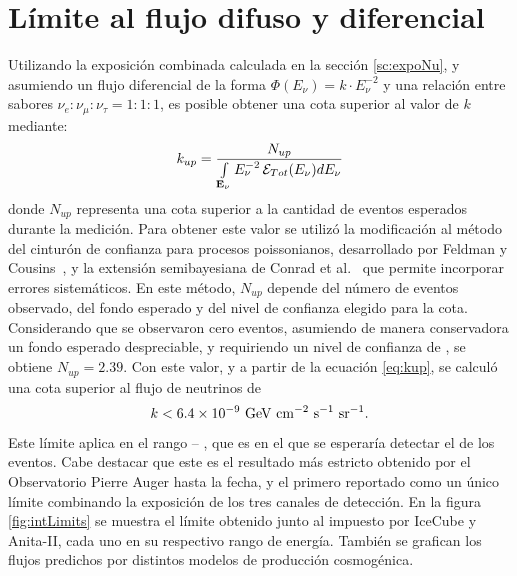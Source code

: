 	\section{L\'imite al flujo difuso y diferencial}
	\label{sc:limiteAuger}
	Utilizando la exposici\'on combinada calculada en la secci\'on \ref{sc:expoNu}, y asumiendo un flujo diferencial de la forma $\Phi(E_\nu)= k\cdot E_\nu^{-2}$ y una relaci\'on entre sabores $\nu_e:\nu_\mu:\nu_\tau=1:1:1$, es posible obtener una cota superior al valor de $k$ mediante:
	\begin{equation}
	 k_{up}=\frac{N_{up}}{\int\limits_{\mathbf{E_{\nu}}} E_\nu^{-2}\,{\cal E}_{Tot}(E_\nu) dE_\nu}
	 \label{eq:kup}
	\end{equation}
	donde $N_{up}$ representa una cota superior a la cantidad de eventos esperados durante la medici\'on.
	Para obtener este valor se utiliz\'o la modificaci\'on al m\'etodo del cintur\'on de confianza para procesos poissonianos, desarrollado por Feldman y Cousins~\cite{cite:Feldman-Cousins}, y la extensi\'on semibayesiana de Conrad et al.~\cite{cite:Conrad_limit} que permite incorporar errores sistem\'aticos.
	En este m\'etodo, $N_{up}$ depende del n\'umero de eventos observado, del fondo esperado y del nivel de confianza elegido para la cota.
	Considerando que se observaron cero eventos, asumiendo de manera conservadora un fondo esperado despreciable, y requiriendo un nivel de confianza de , se obtiene $N_{up}=2.39$.
	Con este valor, y a partir de la ecuaci\'on \ref{eq:kup}, se calcul\'o una cota superior al flujo de neutrinos de
	\begin{equation}
	k < 6.4 \times 10^{-9}~{\rm GeV~cm^{-2}~s^{-1}~sr^{-1}}.
	\label{eq:limitePosta}
	\end{equation}
	Este l\'imite aplica en el rango  -- , que es en el que se esperar\'ia detectar el  de los eventos.
	Cabe destacar que este es el resultado m\'as estricto obtenido por el Observatorio Pierre Auger hasta la fecha, y el primero reportado como un \'unico l\'imite combinando la exposici\'on de los tres canales de detecci\'on.
	En la figura \ref{fig:intLimits} se muestra el límite obtenido junto al impuesto por IceCube y Anita-II, cada uno en su respectivo rango de energía.
	Tambi\'en se grafican los flujos predichos por distintos modelos de producci\'on cosmog\'enica.
